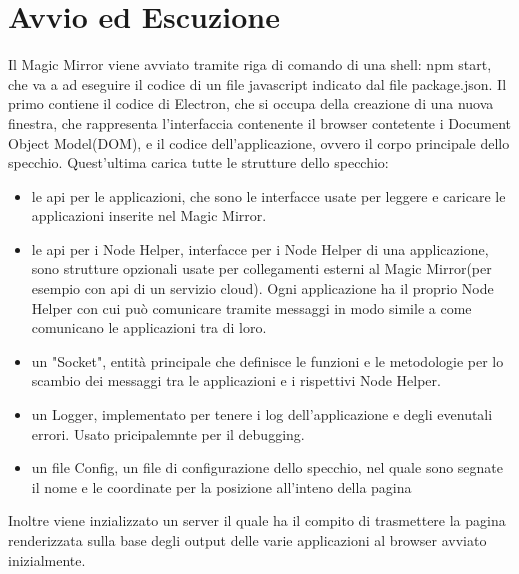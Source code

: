 \section{Avvio ed Escuzione}
Il Magic Mirror viene avviato tramite riga di comando di una shell: npm start, che va a ad eseguire
il codice di un file javascript indicato dal file package.json.
Il primo contiene il codice di Electron, che si occupa della creazione di una nuova finestra, che rappresenta l'interfaccia contenente il browser
contetente i Document Object Model(DOM), e il codice dell'applicazione, ovvero il corpo principale dello specchio.
Quest'ultima carica tutte le strutture dello specchio:
\begin{itemize}
\item le api per le applicazioni, che sono le interfacce usate per leggere e caricare le applicazioni inserite nel Magic Mirror.
\item le api per i Node Helper, interfacce per i Node Helper di una applicazione, sono strutture opzionali usate per collegamenti
esterni al Magic Mirror(per esempio con api di un servizio cloud). Ogni applicazione ha il proprio Node Helper con cui pu\`o comunicare tramite messaggi in modo
simile a come comunicano le applicazioni tra di loro.
\item un "Socket", entit\`a principale che definisce le funzioni e le metodologie per lo scambio dei messaggi tra le applicazioni e i rispettivi Node Helper.
\item un Logger, implementato per tenere i log dell'applicazione e degli evenutali errori. Usato pricipalemnte per il debugging.
\item un file Config, un file di configurazione dello specchio, nel quale sono segnate il nome e le coordinate per la posizione all'inteno della pagina\\[2\baselineskip]
\end{itemize}
Inoltre viene inzializzato un server il quale ha il compito di trasmettere la pagina renderizzata sulla base
degli output delle varie applicazioni al browser avviato inizialmente.


